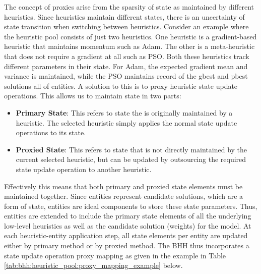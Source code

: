 The concept of proxies arise from the sparsity of state as maintained by different heuristics. Since heuristics maintain different states, there is an uncertainty of state transition when switching between heuristics. Consider an example where the heuristic pool consists of just two heuristics. One heuristic is a gradient-based heuristic that maintains momentum such as \ac{Adam}. The other is a meta-heuristic that does not require a gradient at all such as \ac{PSO}. Both these heuristics track different parameters in their state. For \ac{Adam}, the expected gradient mean and variance is maintained, while the \ac{PSO} maintains record of the gbest and pbest solutions all of entities. A solution to this is to proxy heuristic state update operations. This allows us to maintain state in two parts:

\begin{itemize}
      \item \textbf{Primary State}: This refers to state the is originally maintained by a heuristic. The selected heuristic simply applies the normal state update operations to its state.

      \item \textbf{Proxied State}: This refers to state that is not directly maintained by the current selected heuristic, but can be updated by outsourcing the required state update operation to another heuristic.
\end{itemize}

Effectively this means that both primary and proxied state elements must be maintained together. Since entities represent candidate solutions, which are a form of state, entities are ideal components to store these state parameters. Thus, entities are extended to include the primary state elements of all the underlying low-level heuristics as well as the candidate solution (weights) for the model. At each heuristic-entity application step, all state elements per entity are updated either by primary method or by proxied method. The \ac{BHH} thus incorporates a state update operation proxy mapping as given in the example in Table \ref{tab:bhh:heuristic_pool:proxy_mapping_example} below.


